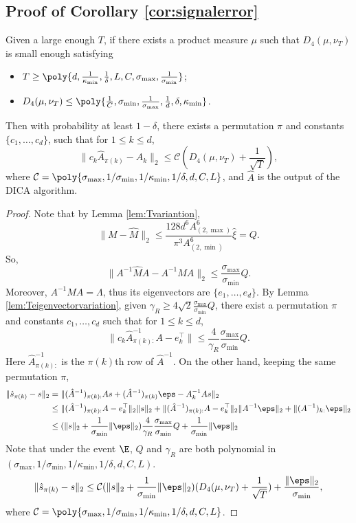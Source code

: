 \subsection{Proof of Corollary \ref{cor:signalerror}}

 Given a large enough $T$, if there exists a product measure $\mu$  such that  $D_4(\mu, \nu_T)$ is small enough satisfying
\begin{itemize}
\vspace{-3mm}
\item $T \ge \poly{d, \frac{1}{\kappa_{\min}}, \frac{1}{\delta}, L, C, \sigma_{\max}, \frac{1}{\sigma_{\min}}}$;
\item $D_4(\mu, \nu_T) \le \poly{\frac{1}{C},  \sigma_{\min},  \frac{1}{\sigma_{\max}},\frac{1}{d}, \delta, \kappa_{\min}}$.
\end{itemize}
\vspace{-2mm}
Then with probability at least $1-\delta$, there exists a permutation $\pi$ and constants $\{c_1,\ldots,c_d\}$, such that for $1\le k\le d$,
\[
\| c_k\hat{A}_{\pi(k)} - A_k\|_2 \le \mathcal{C}\left(D_4(\mu, \nu_T)+\frac{1}{\sqrt{T}}\right),
\]
where $\mathcal{C} = \poly{\sigma_{\max}, 1/\sigma_{\min}, 1/\kappa_{\min},1/\delta, d, C, L}$, and $\hat{A}$ is the output of the DICA algorithm.
\begin{proof}
Note that by Lemma \ref{lem:Tvariantion},
\[
\|M - \hat{M}\|_2 \le  \frac{128d^6A^6_{(2,\max)}}{\pi^3 A^6_{(2,\min)}}\hat{\xi} = Q.
\]
So, 
\[
\|A^{-1}\hat{M}A -A^{-1}MA \|_2 \le \frac{\sigma_{\max}}{\sigma_{\min}}Q.
\]
Moreover, $A^{-1}MA = \Lambda$, thus its eigenvectors are $\{e_1,\ldots,e_d\}$.
By Lemma \ref{lem:Teigenvectorvariation}, given $\gamma_R \ge 4\sqrt{2} \frac{\sigma_{\max}}{\sigma_{\min}}Q$, there exist a permutation $\pi$ and constants ${c_1,\ldots,c_d}$ such that for $1\le k\le d$,
\[
\|c_k\hat{A}^{-1}_{\pi(k):}A - e_k^{\top}\| \le \frac{4}{\gamma_R}\frac{\sigma_{\max}}{\sigma_{\min}}Q.
\]
Here $\hat{A}^{-1}_{\pi(k):}$ is the $\pi(k)$th row of $\hat{A}^{-1}$.
On the other hand, keeping the same permutation $\pi$,
\begin{align*}
\| \hat{s}_{\pi(k)} - s \|_2 & = \|(\hat{A}^{-1})_{\pi(k):}As + (\hat{A}^{-1})_{\pi(k)}\eps - A^{-1}_kAs \|_2 \\
& \le \|(\hat{A}^{-1})_{\pi(k):}A - e_k^{\top}\|_2\|s\|_2 + \|(\hat{A}^{-1})_{\pi(k):}A - e_k^{\top}\|_2\|A^{-1}\eps\|_2 + \|(A^{-1})_{k:}\eps\|_2 \\
& \le (\|s\|_2+\frac{1}{\sigma_{\min}}\|\eps\|_2)\frac{4}{\gamma_R}\frac{\sigma_{\max}}{\sigma_{\min}}Q + \frac{1}{\sigma_{\min}}\|\eps\|_2
\end{align*}  
Note that under the event $\E$,  $Q$ and $\gamma_R$ are both polynomial in $(\sigma_{\max}, 1/\sigma_{\min}, 1/\kappa_{\min},1/\delta, d, C, L)$. 
\[
\| \hat{s}_{\pi(k)} - s \|_2 \le \mathcal{C}(\|s\|_2+\frac{1}{\sigma_{\min}}\|\eps\|_2)(D_4(\mu,\nu_T)+\frac{1}{\sqrt{T}})+\frac{\|\eps\|_2}{\sigma_{\min}},
\]
where $\mathcal{C} = \poly{\sigma_{\max}, 1/\sigma_{\min}, 1/\kappa_{\min},1/\delta, d, C, L}$.
\end{proof}
\fi

